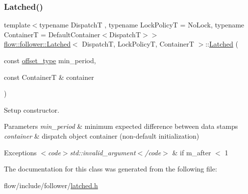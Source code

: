 \subsubsection{\texorpdfstring{Latched()}{Latched()}\hspace{0.1cm}{\footnotesize\ttfamily [2/2]}}
{\footnotesize\ttfamily template$<$typename DispatchT , typename Lock\+PolicyT  = No\+Lock, typename ContainerT  = Default\+Container$<$\+Dispatch\+T$>$$>$ \\
\hyperlink{classflow_1_1follower_1_1_latched}{flow\+::follower\+::\+Latched}$<$ DispatchT, Lock\+PolicyT, ContainerT $>$\+::\hyperlink{classflow_1_1follower_1_1_latched}{Latched} (\begin{DoxyParamCaption}\item[{const \hyperlink{classflow_1_1follower_1_1_latched_ae30442baa432fd3784ecc5199ddcfeb2}{offset\+\_\+type}}]{min\+\_\+period,  }\item[{const ContainerT \&}]{container }\end{DoxyParamCaption})}



Setup constructor. 


\begin{DoxyParams}{Parameters}
{\em min\+\_\+period} & minimum expected difference between data stamps \\
\hline
{\em container} & dispatch object container (non-\/default initialization)\\
\hline
\end{DoxyParams}

\begin{DoxyExceptions}{Exceptions}
{\em $<$code$>$std\+::invalid\+\_\+argument$<$/code$>$} & if {\ttfamily m\+\_\+after $<$ 1} \\
\hline
\end{DoxyExceptions}


The documentation for this class was generated from the following file\+:\begin{DoxyCompactItemize}
\item 
flow/include/follower/\hyperlink{latched_8h}{latched.\+h}\end{DoxyCompactItemize}
